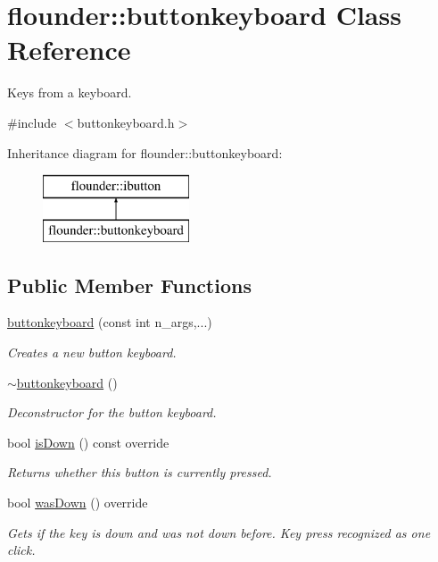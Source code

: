 \hypertarget{classflounder_1_1buttonkeyboard}{}\section{flounder\+:\+:buttonkeyboard Class Reference}
\label{classflounder_1_1buttonkeyboard}


Keys from a keyboard.  




{\ttfamily \#include $<$buttonkeyboard.\+h$>$}

Inheritance diagram for flounder\+:\+:buttonkeyboard\+:\begin{figure}[H]
\begin{center}
\leavevmode
\includegraphics[height=2.000000cm]{classflounder_1_1buttonkeyboard}
\end{center}
\end{figure}
\subsection*{Public Member Functions}
\begin{DoxyCompactItemize}
\item 
\hyperlink{classflounder_1_1buttonkeyboard_a1cb133f346df9c1f0f401574bde868bc}{buttonkeyboard} (const int n\+\_\+args,...)
\begin{DoxyCompactList}\small\item\em Creates a new button keyboard. \end{DoxyCompactList}\item 
\hyperlink{classflounder_1_1buttonkeyboard_a76e965d16462442aaae33fe6fd2421ea}{$\sim$buttonkeyboard} ()
\begin{DoxyCompactList}\small\item\em Deconstructor for the button keyboard. \end{DoxyCompactList}\item 
bool \hyperlink{classflounder_1_1buttonkeyboard_a401cfc086e9729adbf8ac3c72ae59fca}{is\+Down} () const override
\begin{DoxyCompactList}\small\item\em Returns whether this button is currently pressed. \end{DoxyCompactList}\item 
bool \hyperlink{classflounder_1_1buttonkeyboard_abc6b3c8cf9398f2a896408e390fd3a01}{was\+Down} () override
\begin{DoxyCompactList}\small\item\em Gets if the key is down and was not down before. Key press recognized as one click. \end{DoxyCompactList}\end{DoxyCompactItemize}
